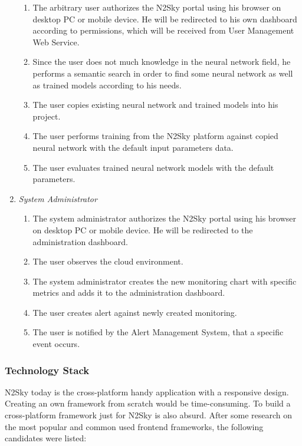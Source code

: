 \begin{enumerate}
\begin{enumerate}
\item The arbitrary user authorizes the N2Sky portal using his browser on desktop PC or mobile device. He will be redirected to his own dashboard according to permissions, which will be received from User Management Web Service. 
\item Since the user does not much knowledge in the neural network field, he performs a semantic search in order to find some neural network as well as trained models according to his needs.
\item The user copies existing neural network and trained models into his project. 
\item The user performs training from the N2Sky platform against copied neural network with the default input parameters data.
\item The user evaluates trained neural network models with the default parameters. 
\end{enumerate}
\item \emph{System Administrator}
\begin{enumerate}
\item The system administrator authorizes the N2Sky portal using his browser on desktop PC or mobile device. He will be redirected to the administration dashboard.
\item The user observes the cloud environment.
\item The system administrator creates the new monitoring chart with specific metrics and adds it to the administration dashboard.
\item The user creates alert against newly created monitoring.
\item The user is notified by the Alert Management System, that a specific event occurs.
\end{enumerate}
\end{enumerate}


\subsubsection{Technology Stack}\label{Technology Stack}

N2Sky today is the cross-platform handy application with a responsive design. Creating an own framework from scratch would be time-consuming. To build a cross-platform framework just for N2Sky is also absurd. After some research on the most popular and common used frontend frameworks, the following candidates were listed: 

